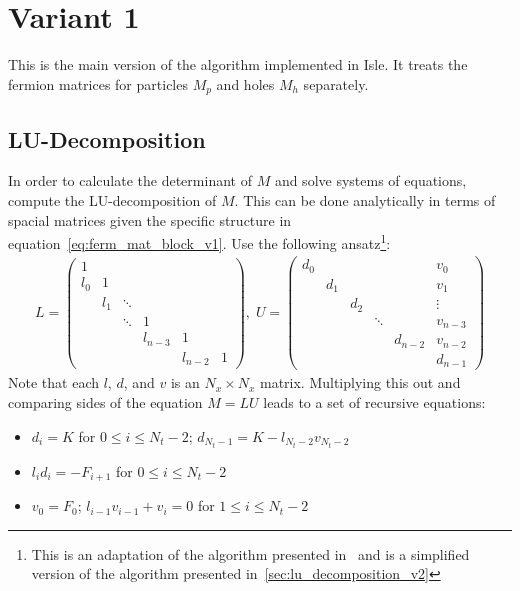 \documentclass[a4paper, fleqn, twoside, notitlepage]{scrartcl}
\begin{document}
\section{Variant 1}\label{sec:variant1}

This is the main version of the algorithm implemented in Isle.
It treats the fermion matrices for particles $M_p$ and holes $M_h$ separately.

\subsection{LU-Decomposition}\label{sec:lu_v1}

In order to calculate the determinant of $M$ and solve systems of equations, compute the LU-decomposition of $M$. This can be done analytically in terms of spacial matrices given the specific structure in equation~\eqref{eq:ferm_mat_block_v1}.
Use the following ansatz\footnote{This is an adaptation of the algorithm presented in~\cite{zivkovic:2013} and is a simplified version of the algorithm presented in~\cref{sec:lu_decomposition_v2}}:
\begin{align}
  L =
  \begin{pmatrix}
    1   &     &    &        &        &\\
    l_0 & 1   &    &        &        &\\
        & l_1 & \ddots &        &        &\\
        &     & \ddots & 1      &        &\\
        &     &   & l_{n-3} & 1      &\\
        &     &   &        & l_{n-2} & 1
  \end{pmatrix},
  \; U =
  \begin{pmatrix}
    d_0 &     &      &   &        & v_0\\
        & d_1 &     &    &        & v_1\\
        &     & d_2 &    &        & \vdots \\
        &     &     & \ddots &        & v_{n-3} \\
        &     &     &    & d_{n-2} & v_{n-2} \\
        &     &     &    &        & d_{n-1}
  \end{pmatrix}
\end{align}
Note that each $l$, $d$, and $v$ is an $N_x \times N_x$ matrix. Multiplying this out and comparing sides of the equation $M = LU$ leads to a set of recursive equations:
\begin{itemize}
\item $d_i = K$ for $0 \le i \le N_t-2$;\hspace{2em} $d_{N_t-1} = K - l_{N_t-2}v_{N_t-2}$
\item $l_i d_i = -F_{i+1}$ for $0 \le i \le N_t-2$
\item $v_0 = F_0$;\hspace{2em} $l_{i-1} v_{i-1} + v_i = 0$ for $1 \le i \le N_t-2$
\end{itemize}
\end{document}
